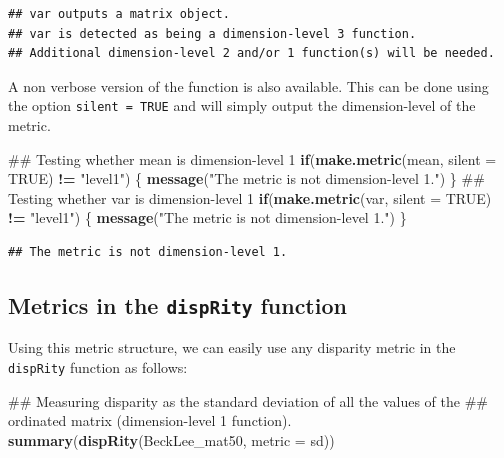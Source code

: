 \documentclass[]{book}
\newenvironment{Shaded}{\begin{snugshade}}{\end{snugshade}}
\newcommand{\KeywordTok}[1]{\textcolor[rgb]{0.13,0.29,0.53}{\textbf{#1}}}
\newcommand{\DataTypeTok}[1]{\textcolor[rgb]{0.13,0.29,0.53}{#1}}
\newcommand{\StringTok}[1]{\textcolor[rgb]{0.31,0.60,0.02}{#1}}
\newcommand{\OtherTok}[1]{\textcolor[rgb]{0.56,0.35,0.01}{#1}}
\newcommand{\ControlFlowTok}[1]{\textcolor[rgb]{0.13,0.29,0.53}{\textbf{#1}}}
\newcommand{\OperatorTok}[1]{\textcolor[rgb]{0.81,0.36,0.00}{\textbf{#1}}}
\newcommand{\NormalTok}[1]{#1}
\theoremstyle{definition}
\theoremstyle{definition}
\theoremstyle{remark}
\begin{document}
\begin{verbatim}
## var outputs a matrix object.
## var is detected as being a dimension-level 3 function.
## Additional dimension-level 2 and/or 1 function(s) will be needed.
\end{verbatim}

A non verbose version of the function is also available. This can be
done using the option \texttt{silent\ =\ TRUE} and will simply output
the dimension-level of the metric.

\begin{Shaded}
\begin{Highlighting}[]
\NormalTok{## Testing whether mean is dimension-level 1}
\ControlFlowTok{if}\NormalTok{(}\KeywordTok{make.metric}\NormalTok{(mean, }\DataTypeTok{silent =} \OtherTok{TRUE}\NormalTok{) }\OperatorTok{!=}\StringTok{ "level1"}\NormalTok{) \{}
    \KeywordTok{message}\NormalTok{(}\StringTok{"The metric is not dimension-level 1."}\NormalTok{)}
\NormalTok{\}}
\NormalTok{## Testing whether var is dimension-level 1}
\ControlFlowTok{if}\NormalTok{(}\KeywordTok{make.metric}\NormalTok{(var, }\DataTypeTok{silent =} \OtherTok{TRUE}\NormalTok{) }\OperatorTok{!=}\StringTok{ "level1"}\NormalTok{) \{}
    \KeywordTok{message}\NormalTok{(}\StringTok{"The metric is not dimension-level 1."}\NormalTok{)}
\NormalTok{\}}
\end{Highlighting}
\end{Shaded}

\begin{verbatim}
## The metric is not dimension-level 1.
\end{verbatim}

\subsection{\texorpdfstring{Metrics in the \texttt{dispRity}
function}{Metrics in the dispRity function}}\label{metrics-in-the-disprity-function}

Using this metric structure, we can easily use any disparity metric in
the \texttt{dispRity} function as follows:

\begin{Shaded}
\begin{Highlighting}[]
\NormalTok{## Measuring disparity as the standard deviation of all the values of the}
\NormalTok{## ordinated matrix (dimension-level 1 function).}
\KeywordTok{summary}\NormalTok{(}\KeywordTok{dispRity}\NormalTok{(BeckLee_mat50, }\DataTypeTok{metric =}\NormalTok{ sd))}
\end{Highlighting}
\end{Shaded}
\end{document}
